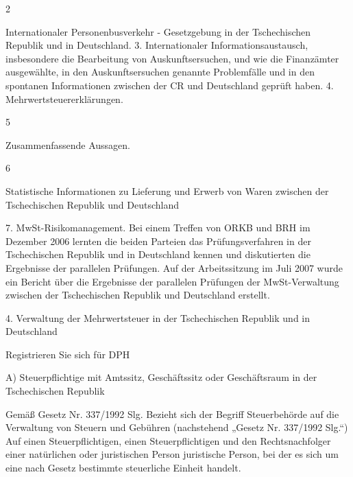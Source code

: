 \documentclass[10pt]{article}
\begin{document}
2

Internationaler Personenbusverkehr - Gesetzgebung in der Tschechischen Republik und in Deutschland.
3. Internationaler Informationsaustausch, insbesondere die Bearbeitung von Auskunftsersuchen, und wie die Finanzämter ausgewählte, in den Auskunftsersuchen genannte Problemfälle und in den spontanen Informationen zwischen der CR und Deutschland geprüft haben.
4. Mehrwertsteuererklärungen.


5

Zusammenfassende Aussagen.


6



Statistische Informationen zu Lieferung und Erwerb von Waren zwischen der Tschechischen Republik und Deutschland

7. MwSt-Risikomanagement.
Bei einem Treffen von ORKB und BRH im Dezember 2006 lernten die beiden Parteien das Prüfungsverfahren in der Tschechischen Republik und in Deutschland kennen und diskutierten die Ergebnisse der parallelen Prüfungen.
Auf der Arbeitssitzung im Juli 2007 wurde ein Bericht über die Ergebnisse der parallelen Prüfungen der MwSt-Verwaltung zwischen der Tschechischen Republik und Deutschland erstellt.


4. Verwaltung der Mehrwertsteuer in der Tschechischen Republik und in Deutschland



Registrieren Sie sich für DPH



A) Steuerpflichtige mit Amtssitz, Geschäftssitz oder Geschäftsraum in der Tschechischen Republik

Gemäß Gesetz Nr. 337/1992 Slg. Bezieht sich der Begriff Steuerbehörde auf die Verwaltung von Steuern und Gebühren (nachstehend „Gesetz Nr. 337/1992 Slg.“) Auf einen Steuerpflichtigen, einen Steuerpflichtigen und den Rechtsnachfolger einer natürlichen oder juristischen Person juristische Person, bei der es sich um eine nach Gesetz bestimmte steuerliche Einheit handelt.
\end{document}
